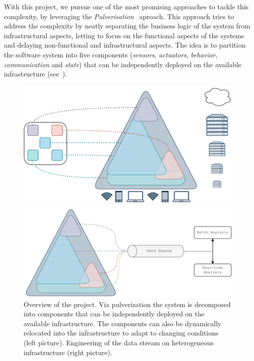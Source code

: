 \documentclass[12pt]{article}
\begin{document}
With this project,
we pursue one of the most promising approaches to tackle this complexity,
by leveraging the \emph{Pulverisation}~\cite{DBLP:journals/fi/CasadeiPPVW20} aproach.
%
This approach tries to address the complexity by neatly separating the business logic of the system from infrastructural aspects,
letting to focus on the functional aspects of the systems and delaying non-functional and infrastructural aspects.
%
The idea is to partition the software system into five components (\emph{sensors}, \emph{actuators}, \emph{behavior}, \emph{communication} and \emph{state})
that can be independently deployed on the available infrastructure (see~).
%
\begin{figure}[ht]
	\centering
	\begin{minipage}[t]{0.45\textwidth}
		\includegraphics[width=.9\textwidth]{img/phd-proposal.drawio.pdf}
	\end{minipage}
	\hfill
	\begin{minipage}[t]{0.45\textwidth}
		\includegraphics[width=.9\textwidth]{img/data-stream.drawio.pdf}
	\end{minipage}

	\caption{
		Overview of the project.
		Via pulverization the system is decomposed into components that can be independently deployed on the available infrastructure.
		The components can also be dynamically relocated into the infrastructure to adapt to changing conditions (left picture).
		Engineering of the data stream on heterogeneous infrastructure (right picture).
	}
	\label{fig:overview}
\end{figure}
\end{document}
